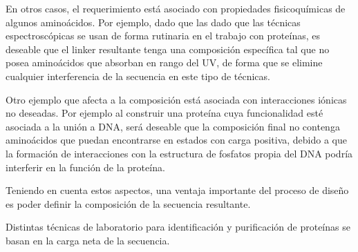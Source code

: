 En otros casos, el requerimiento está asociado con propiedades fisicoquímicas de algunos aminoácidos. 
Por ejemplo, dado que las dado que las técnicas espectroscópicas se usan de forma rutinaria en el trabajo con proteínas, es deseable que el linker resultante tenga una composición específica tal que no posea aminoácidos que absorban en rango 
del UV, de forma que se elimine cualquier interferencia de la secuencia en este tipo de técnicas.

Otro ejemplo que afecta a la composición está asociada con interacciones iónicas no deseadas. 
Por ejemplo al construir una proteína cuya funcionalidad esté asociada a la unión a DNA, será deseable que la composición final no contenga aminoácidos que puedan encontrarse en estados con carga positiva, debido a que 
la formación de interacciones con la estructura de fosfatos propia del DNA podría interferir en la función de la proteína.

Teniendo en cuenta estos aspectos, una ventaja importante del proceso de diseño es poder definir la composición de la secuencia resultante.


Distintas técnicas de laboratorio para identificación y purificación de proteínas se basan en la carga neta de la secuencia.







